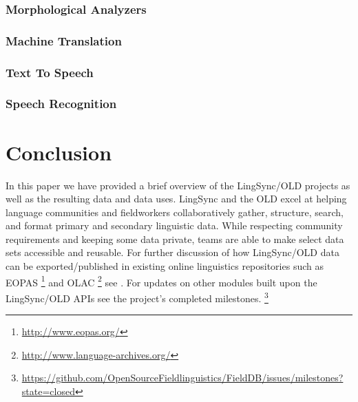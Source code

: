 \documentclass[11pt]{article}
\begin{document}
\subsubsection{Morphological Analyzers}
\subsubsection{Machine Translation}
\subsubsection{Text To Speech}
\subsubsection{Speech Recognition}


\section{Conclusion}

In this paper we have provided a brief overview of the LingSync/OLD projects as
well as the resulting data and data uses. LingSync and the OLD excel at helping
language communities and fieldworkers collaboratively gather, structure,
search, and format primary and secondary linguistic data. While respecting
community requirements and keeping some data private, teams are able to make
select data sets accessible and reusable. For further discussion of how
LingSync/OLD data can be exported/published in existing online linguistics
repositories such as EOPAS%
\footnote{\url{http://www.eopas.org/}} %
and OLAC%
\footnote{\url{http://www.language-archives.org/}} %
see \cite{lingsync:2012}. For updates on other modules built upon the
LingSync/OLD APIs see the project's completed milestones.%
\footnote{\url{https://github.com/OpenSourceFieldlinguistics/FieldDB/issues/milestones?state=closed}}


\printglossary




\end{document}
